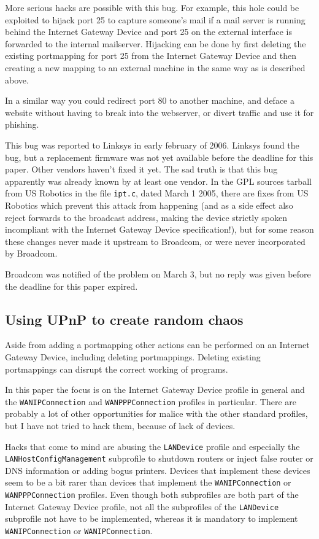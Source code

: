 \documentclass[10pt]{article}
\begin{document}
More serious hacks are possible with this bug. For example, this hole could be
exploited to hijack port 25 to capture someone's mail if a mail server is
running behind the Internet Gateway Device and port 25 on the external
interface is forwarded to the internal mailserver. Hijacking can be done by
first deleting the existing portmapping for port 25 from the Internet Gateway
Device and then creating a new mapping to an external machine in the same
way as is described above.

In a similar way you could redirect port 80 to another machine, and deface
a website without having to break into the webserver, or divert traffic and
use it for phishing.

This bug was reported to Linksys in early february of 2006. Linksys found
the bug, but a replacement firmware was not yet available before the deadline
for this paper. Other vendors haven't fixed it yet. The sad truth is that this
bug apparently was already known by at least one vendor. In the GPL sources
tarball from US Robotics in the file \texttt{ipt.c}, dated March 1 2005, there
are fixes from US Robotics which prevent this attack from happening (and as a
side effect also reject forwards to the broadcast address, making the device
strictly spoken incompliant with the Internet Gateway Device specification!),
but for some reason these changes never made it upstream to Broadcom, or were
never incorporated by Broadcom.

Broadcom was notified of the problem on March 3, but no reply was given
before the deadline for this paper expired.

\subsection{Using UPnP to create random chaos}

Aside from adding a portmapping other actions can be performed on an
Internet Gateway Device, including deleting portmappings. Deleting
existing portmappings can disrupt the correct working of programs.

In this paper the focus is on the Internet Gateway Device profile in general
and the \texttt{WANIPConnection} and \texttt{WANPPPConnection} profiles
in particular. There are probably a lot of other opportunities for malice
with the other standard profiles, but I have not tried to hack them,
because of lack of devices.

Hacks that come to mind are abusing the \texttt{LANDevice} profile and
especially the \texttt{LANHostConfigManagement} subprofile to shutdown
routers or inject false router or DNS information or adding bogus printers.
Devices that implement these devices seem to be a bit rarer than devices that
implement the \texttt{WANIPConnection} or \texttt{WANPPPConnection} profiles.
Even though both subprofiles are both part of the Internet Gateway Device
profile, not all the subprofiles of the \texttt{LANDevice} subprofile not
have to be implemented, whereas it is mandatory to implement
\texttt{WANIPConnection} or \texttt{WANIPConnection}.
\end{document}
